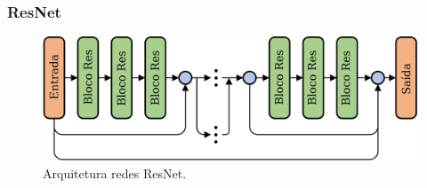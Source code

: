 \documentclass{beamer}
\begin{document}
\begin{frame}
    \frametitle{ResNet}

    \begin{figure}[!ht]
        \centering
        \includegraphics[width=0.9\columnwidth]{Imagens/An-illustration-of-the-deep-residual-network-ResNet-structure-More-shortcut.jpg}
        \caption{ Arquitetura redes ResNet.}
       \label{fig:ResNet-Rsp}
    \end{figure}
\end{frame}
\end{document}
